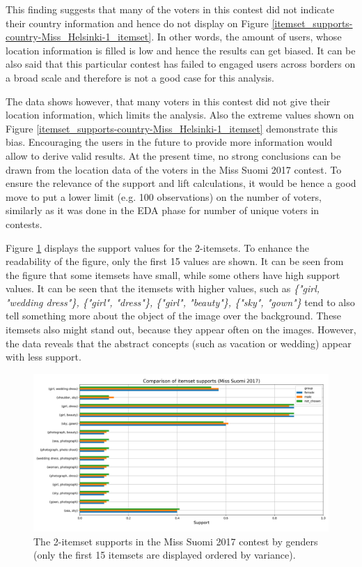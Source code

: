 This finding suggests that many of the voters in this contest did not indicate their country information and hence do not display on Figure \ref{itemset_supports-country-Miss_Helsinki-1_itemset}. In other words, the amount of users, whose location information is filled is low and hence the results can get biased. It can be also said that this particular contest has failed to engaged users across borders on a broad scale and therefore is not a good case for this analysis.

The data shows however, that many voters in this contest did not give their location information, which limits the analysis. Also the extreme values shown on Figure \ref{itemset_supports-country-Miss_Helsinki-1_itemset} demonstrate this bias. Encouraging the users in the future to provide more information would allow to derive valid results. At the present time, no strong conclusions can be drawn from the location data of the voters in the Miss Suomi 2017 contest. To ensure the relevance of the support and lift calculations, it would be hence a good move to put a lower limit (e.g. 100 observations) on the number of voters, similarly as it was done in the EDA phase for number of unique voters in contests.

Figure \ref{itemset_supports-gender-Miss_Helsinki-2_itemset} displays the support values for the 2-itemsets. To enhance the readability of the figure, only the first 15 values are shown. It can be seen from the figure that some itemsets have small, while some others have high support values. It can be seen that the itemsets with higher values, such as \emph{\{"girl, "wedding dress"\}, \{"girl", "dress"\}, \{"girl", "beauty"\}, \{"sky", "gown"\}} tend to also tell something more about the object of the image over the background. These itemsets also might stand out, because they appear often on the images. However, the data reveals that the abstract concepts (such as vacation or wedding) appear with less support. 

\begin{figure}[h] 
    \begin{center}
        \includegraphics[width=1.0\textwidth]{Images/itemset_supports-gender-Miss_Helsinki-2_itemset.png}
        \caption{The 2-itemset supports in the Miss Suomi 2017 contest by genders (only the first 15 itemsets are displayed ordered by variance).}
        \label{itemset_supports-gender-Miss_Helsinki-2_itemset}
    \end{center}
\end{figure}

